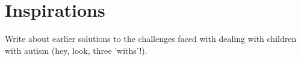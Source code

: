 \section{Inspirations}
Write about earlier solutions to the challenges faced with dealing with children with autism (hey, look, three 'withs'!).